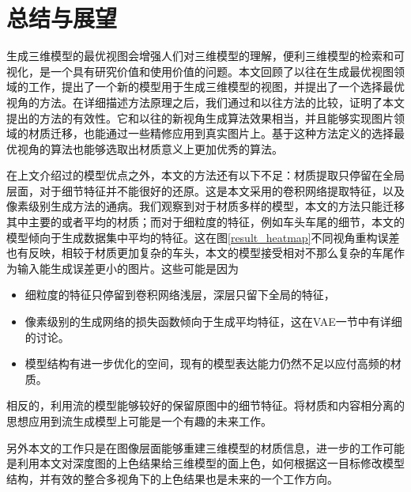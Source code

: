 \documentclass[UTF8,openany,AutoFakeBold,AutoFakeSlant,cs4size]{ctexbook}
\begin{document}
\clearpage

\chapter{总结与展望}

生成三维模型的最优视图会增强人们对三维模型的理解，便利三维模型的检索和可视化，是一个具有研究价值和使用价值的问题。本文回顾了以往在生成最优视图领域的工作，提出了一个新的模型用于生成三维模型的视图，并提出了一个选择最优视角的方法。在详细描述方法原理之后，我们通过和以往方法的比较，证明了本文提出的方法的有效性。它和以往的新视角生成算法效果相当，并且能够实现图片领域的材质迁移，也能通过一些精修应用到真实图片上。基于这种方法定义的选择最优视角的算法也能够选取出材质意义上更加优秀的算法。

在上文介绍过的模型优点之外，本文的方法还有以下不足：材质提取只停留在全局层面，对于细节特征并不能很好的还原。这是本文采用的卷积网络提取特征，以及像素级别生成方法的通病。我们观察到对于材质多样的模型，本文的方法只能迁移其中主要的或者平均的材质；而对于细粒度的特征，例如车头车尾的细节，本文的模型倾向于生成数据集中平均的特征。这在图\ref{result_heatmap}不同视角重构误差也有反映，相较于材质更加复杂的车头，本文的模型接受相对不那么复杂的车尾作为输入能生成误差更小的图片。这些可能是因为
\begin{itemize}
	\item 细粒度的特征只停留到卷积网络浅层，深层只留下全局的特征，
	\item 像素级别的生成网络的损失函数倾向于生成平均特征，这在VAE一节中有详细的讨论。
	\item 模型结构有进一步优化的空间，现有的模型表达能力仍然不足以应付高频的材质。
\end{itemize}
相反的，利用流的模型能够较好的保留原图中的细节特征。将材质和内容相分离的思想应用到流生成模型上可能是一个有趣的未来工作。

另外本文的工作只是在图像层面能够重建三维模型的材质信息，进一步的工作可能是利用本文对深度图的上色结果给三维模型的面上色，如何根据这一目标修改模型结构，并有效的整合多视角下的上色结果也是未来的一个工作方向。





\clearpage


{
	\fancyhf{}
	\fancyfoot[CO,CE]{~\thepage~}
	\renewcommand{\headrulewidth}{0.7pt}
	\renewcommand{\footrulewidth}{0pt}
}
\fancyhf{}
\fancyfoot[CO,CE]{~\thepage~}
\renewcommand{\headrulewidth}{0.7pt}
\renewcommand{\footrulewidth}{0pt}
\end{document}
